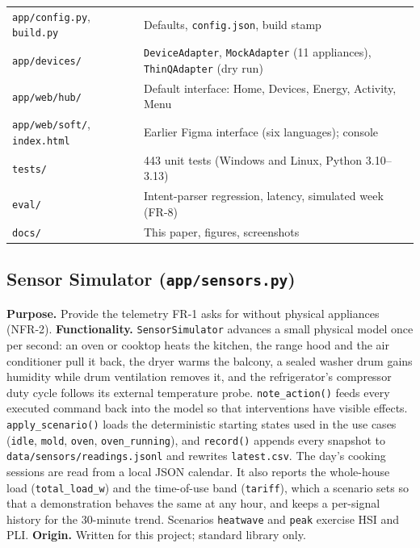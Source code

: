 \documentclass[conference]{IEEEtran}
\begin{document}
\begin{table}[!t]
\begin{tabular}{@{}L{3.35cm}L{4.95cm}@{}}
\texttt{app/config.py}, \texttt{build.py} & Defaults, \texttt{config.json}, build stamp \\
\texttt{app/devices/} & \texttt{DeviceAdapter}, \texttt{MockAdapter} (11 appliances), \texttt{ThinQAdapter} (dry run) \\
\texttt{app/web/hub/} & Default interface: Home, Devices, Energy, Activity, Menu \\
\texttt{app/web/soft/}, \texttt{index.html} & Earlier Figma interface (six languages); console \\
\texttt{tests/} & 443 unit tests (Windows and Linux, Python 3.10--3.13) \\
\texttt{eval/} & Intent-parser regression, latency, simulated week (FR-8) \\
\texttt{docs/} & This paper, figures, screenshots \\
\bottomrule
\end{tabular}
\end{table}

\subsection{Sensor Simulator (\texttt{app/sensors.py})}
\textbf{Purpose.} Provide the telemetry FR-1 asks for without physical appliances (NFR-2).
\textbf{Functionality.} \texttt{SensorSimulator} advances a small physical model once per second: an oven or cooktop heats the kitchen, the range hood and the air conditioner pull it back, the dryer warms the balcony, a sealed washer drum gains humidity while drum ventilation removes it, and the refrigerator's compressor duty cycle follows its external temperature probe. \texttt{note\_action()} feeds every executed command back into the model so that interventions have visible effects. \texttt{apply\_scenario()} loads the deterministic starting states used in the use cases (\texttt{idle}, \texttt{mold}, \texttt{oven}, \texttt{oven\_running}), and \texttt{record()} appends every snapshot to \texttt{data/sensors/readings.jsonl} and rewrites \texttt{latest.csv}. The day's cooking sessions are read from a local JSON calendar.
It also reports the whole-house load (\texttt{total\_load\_w}) and the time-of-use band (\texttt{tariff}), which a scenario sets so that a demonstration behaves the same at any hour, and keeps a per-signal history for the 30-minute trend. Scenarios \texttt{heatwave} and \texttt{peak} exercise HSI and PLI.
\textbf{Origin.} Written for this project; standard library only.
\end{document}
